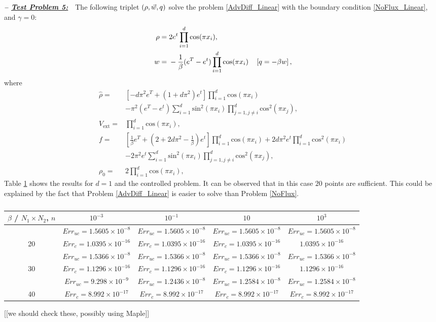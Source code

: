 \textbf{\emph{-- \underline{Test Problem 5:}}}~~The following triplet $(\rho,\vec{w},q)$ solve the problem \eqref{AdvDiff_Linear} with the boundary condition \eqref{NoFlux_Linear}, and $\gamma =0$:
\begin{align*}
\ \rho={}&2e^{t}\prod_{i=1}^{d}\text{cos}(\pi{}x_i), \\
\ w={}&-\frac{1}{\beta}(e^{T}-e^{t})\prod_{i=1}^{d}\text{cos}(\pi{}x_i)\quad\left[\adj=-\beta{}w\right],
\end{align*}
where
\begin{align*}
\ \widehat{\rho}={}&\left[-d\pi^2{}e^{T}+(1+d\pi^2)e^{t}\right]\prod_{i=1}^{d}\text{cos}(\pi{}x_i) \\
\ &-\pi^{2}(e^{T}-e^{t})\sum_{i=1}^{d}\text{sin}^2(\pi{}x_i)\prod_{j=1,j\neq{}i}^{d}\text{cos}^2(\pi{}x_j), \\
\ V_{\text{ext}}={}&\prod_{i=1}^{d}\text{cos}(\pi{}x_i), \\
\ f={}&\left[\frac{1}{\beta}e^{T}+\left(2+2d\pi^2-\frac{1}{\beta}\right)e^{t}\right]\prod_{i=1}^{d}\text{cos}(\pi{}x_i)+2d\pi^{2}e^{t}\prod_{i=1}^{d}\text{cos}^2\left(\pi{}x_i\right) \\
\ &-2\pi^{2}e^{t}\sum_{i=1}^{d}\text{sin}^2(\pi{}x_i)\prod_{j=1,j\neq{}i}^{d}\text{cos}^2(\pi{}x_j), \\
\ \rho_{0}={}&2\prod_{i=1}^{d}\text{cos}(\pi{}x_i),
\end{align*}
Table \ref{TabApp1d} shows the results for $d=1$ and the controlled problem. It can be observed that in this case $20$ points are sufficient. This could be explained by the fact that Problem \eqref{AdvDiff_Linear} is easier to solve than Problem \eqref{NoFlux}.

\begin{table}
	\begin{tabular}{ ||c|| c | c |c | c ||}
		\hline
		$\beta$ / $N_1 \times N_2$, $n$ & $10^{-3}$  & $10^{-1}$  & $10$ & $10^3$ \\ 
		\hline 
		&$Err_{uc} = 1.5605\times 10^{-8}$ &$Err_{uc} = 1.5605\times 10^{-8}$ &$Err_{uc} = 1.5605\times 10^{-8}$ &$Err_{uc} = 1.5605\times 10^{-8}$\\
		20    &$Err_{c} = 1.0395\times 10^{-16}$ &$Err_{c} = 1.0395\times 10^{-16}$ &$Err_{c} = 1.0395\times 10^{-16}$ &$ 1.0395\times 10^{-16}$\\
		\hline 
		&$Err_{uc} =1.5366\times 10^{-8}$ &$Err_{uc} =1.5366\times 10^{-8}$ &$Err_{uc} = 1.5366\times 10^{-8}$ &$Err_{uc} = 1.5366 \times 10^{-8}$\\
		30     &$Err_{c} =1.1296\times 10^{-16}$ &$Err_{c} = 1.1296\times 10^{-16}$ &$Err_{c} =1.1296\times 10^{-16}$ &$1.1296\times 10^{-16}$\\
		\hline 
		&$Err_{uc} = 9.298\times 10^{-9}$ &$Err_{uc} = 1.2436\times 10^{-8}$ &$Err_{uc} = 1.2584\times 10^{-8}$ &$Err_{uc} = 1.2584\times 10^{-8}$\\
		40     &$Err_{c} = 8.992 \times 10^{-17}$ &$Err_{c} = 8.992\times 10^{-17}$ &$Err_{c} = 8.992\times 10^{-17}$ &$Err_{c} = 8.992\times 10^{-17}$\\
		\hline 
	\end{tabular}
	\caption{}
	\label{TabApp1d}
\end{table}

[[we should check these, possibly using Maple]]


